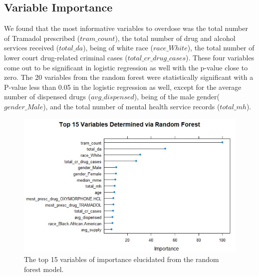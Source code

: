 \documentclass[twoside,10.5pt]{article}
\begin{document}
\subsection{Variable Importance}
We found that the most informative variables to overdose was the total number of Tramadol prescribed ($tram\_count$), the total number of drug and alcohol services received ($total\_da$), being of white race ($race\_White$), the total number of lower court drug-related criminal cases ($total\_cr\_drug\_cases$).
These four variables come out to be significant in logistic regression as well with the p-value close to zero. The 20 variables from the random forest were statistically significant with a P-value less than 0.05 in the logistic regression as well, except for the average number of dispensed drugs ($avg\_dispensed$), being of the male gender($gender\_Male$), and the total number of mental health service records ($total\_mh$).

\begin{figure}[h!]
\centering
\includegraphics[width=12cm]{images/variable_importance.JPG}
\caption{The top 15 variables of importance elucidated from the random forest model.}
\label{fig:var_importance}
\end{figure}
\end{document}
